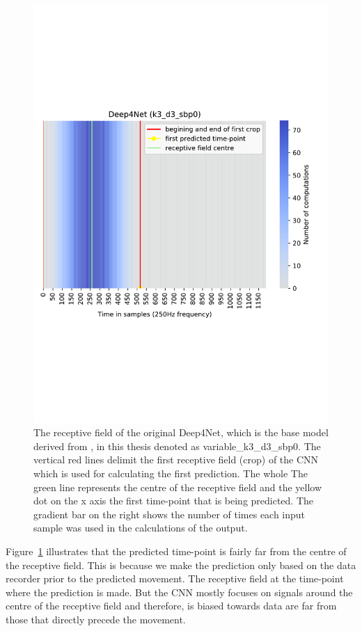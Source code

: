 \begin{figure}[!htbp]
\centering
\includegraphics[width=0.8\linewidth]{img/ch3/deep4net-receptive-field}
\caption[Receptive field]{The receptive field of the original Deep4Net, which is the base model derived from \cite{Hammer-2021}, in this thesis denoted as {variable}\_k3\_d3\_sbp0.
The vertical red lines delimit the first receptive field (crop) of the CNN which is used for calculating the first prediction.
The whole 
The green line represents the centre of the receptive field and the yellow dot on the x axis the first time-point that is being predicted. The gradient bar on the right shows the number of times each input sample was used in the calculations of the output.}
\label{fig:receptive-field}
\end{figure}

Figure~\ref{fig:receptive-field} illustrates that the predicted time-point is fairly far from the centre of the receptive field.
This is because we make the prediction only based on the data recorder prior to the predicted movement.
The receptive field at the time-point where the prediction is made.
But the CNN mostly focuses on signals around the centre of the receptive field and therefore, is biased towards data are far from those that directly precede the movement. \\

